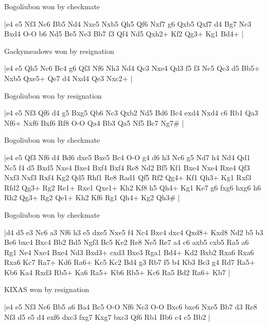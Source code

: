 \showboard

Bogoliubon won by checkmate

\makegametitle
|e4 e5 Nf3 Nc6 Bb5 Nd4 Nxe5 Nxb5 Qh5 Qf6 Nxf7 g6 Qxb5 Qxf7 d4 Bg7 Nc3 Bxd4 O-O b6 Nd5 Be5 Ne3 Bb7 f3 Qf4 Nd5 Qxh2+ Kf2 Qg3+ Kg1 Bd4+  |

\showboard

Gackymeadows won by resignation

\makegametitle
|e4 e5 Qh5 Nc6 Bc4 g6 Qf3 Nf6 Nh3 Nd4 Qc3 Nxe4 Qd3 f5 f3 Nc5 Qc3 d5 Bb5+ Nxb5 Qxe5+ Qe7 d4 Nxd4 Qe3 Nxc2+  |

\showboard

Bogoliubon won by resignation

\makegametitle
|e4 e5 Nf3 Qf6 d4 g5 Bxg5 Qb6 Nc3 Qxb2 Nd5 Bd6 Bc4 exd4 Nxd4 c6 Rb1 Qa3 Nf6+ Nxf6 Bxf6 Rf8 O-O Qa4 Bb3 Qa5 Nf5 Bc7 Ng7\#  |

\showboard

Bogoliubon won by checkmate

\makegametitle
|e4 e5 Qf3 Nf6 d4 Bd6 dxe5 Bxe5 Bc4 O-O g4 d6 h3 Nc6 g5 Nd7 h4 Nd4 Qd1 Nc5 f4 d5 Bxd5 Nxe4 Bxe4 Bxf4 Bxf4 Re8 Nd2 Bf5 Kf1 Bxe4 Nxe4 Rxe4 Qf3 Nxf3 Nxf3 Rxf4 Kg2 Qd5 Rhf1 Re8 Rad1 Qf5 Rf2 Qg4+ Kf1 Qh3+ Kg1 Rxf3 Rfd2 Qg3+ Rg2 Re1+ Rxe1 Qxe1+ Kh2 Kf8 h5 Qh4+ Kg1 Ke7 g6 fxg6 hxg6 h6 Rh2 Qg3+ Rg2 Qe1+ Kh2 Kf6 Rg1 Qh4+ Kg2 Qh3\#  |

\showboard

Bogoliubon won by checkmate

\makegametitle
|d4 d5 e3 Nc6 a3 Nf6 h3 e5 dxe5 Nxe5 f4 Nc4 Bxc4 dxc4 Qxd8+ Kxd8 Nd2 b5 b3 Be6 bxc4 Bxc4 Bb2 Bd5 Ngf3 Bc5 Ke2 Re8 Ne5 Re7 a4 c6 axb5 cxb5 Ra5 a6 Rg1 Ne4 Nxe4 Bxe4 Nd3 Bxd3+ cxd3 Bxe3 Rga1 Bd4+ Kd2 Bxb2 Rxa6 Rxa6 Rxa6 Kc7 Ra7+ Kd6 Ra6+ Kc5 Kc2 Bd4 g3 Rb7 f5 b4 Kb3 Bc3 g4 Rd7 Ra5+ Kb6 Ka4 Rxd3 Rb5+ Ka6 Ra5+ Kb6 Rb5+ Kc6 Ra5 Bd2 Ra6+ Kb7  |

\showboard

KIXAS won by resignation

\makegametitle
|e4 e5 Nf3 Nc6 Bb5 a6 Ba4 Bc5 O-O Nf6 Nc3 O-O Bxc6 bxc6 Nxe5 Bb7 d3 Re8 Nf3 d5 e5 d4 exf6 dxc3 fxg7 Kxg7 bxc3 Qf6 Rb1 Bb6 c4 c5 Bb2  |

